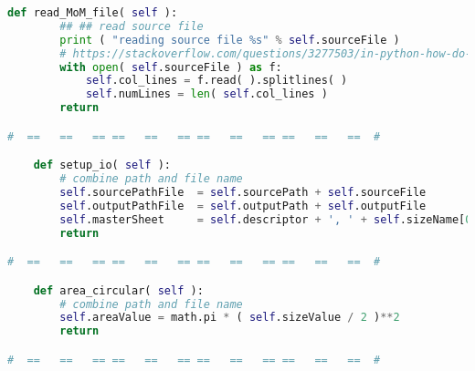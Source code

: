 {{\begin{lstlisting}[language=Python]
    def read_MoM_file( self ):
        ## ## read source file
        print ( "reading source file %s" % self.sourceFile )
        # https://stackoverflow.com/questions/3277503/in-python-how-do-i-read-a-file-line-by-line-into-a-list
        with open( self.sourceFile ) as f:
            self.col_lines = f.read( ).splitlines( )
            self.numLines = len( self.col_lines )
        return

#  ==   ==   == ==   ==   == ==   ==   == ==   ==   ==  #

    def setup_io( self ):
        # combine path and file name
        self.sourcePathFile  = self.sourcePath + self.sourceFile
        self.outputPathFile  = self.outputPath + self.outputFile
        self.masterSheet     = self.descriptor + ', ' + self.sizeName[0] + ' = ' + str( self.sizeValue ) + ' ' + self.sizeUnits
        return

#  ==   ==   == ==   ==   == ==   ==   == ==   ==   ==  #

    def area_circular( self ):
        # combine path and file name
        self.areaValue = math.pi * ( self.sizeValue / 2 )**2
        return

#  ==   ==   == ==   ==   == ==   ==   == ==   ==   ==  #
	\end{lstlisting}
	}}

\endinput  %
